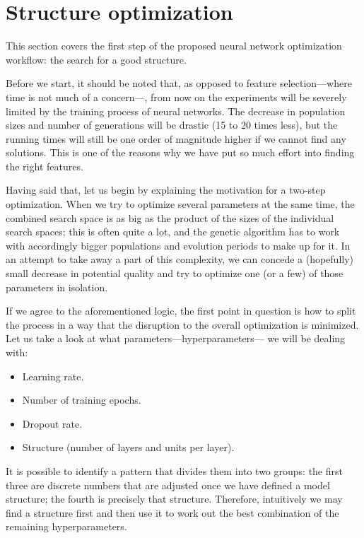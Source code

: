 \newpage

\section{Structure optimization}\label{sec:res_so}

	This section covers the first step of the proposed neural network optimization workflow: the search for a good structure.

	Before we start, it should be noted that, as opposed to feature selection---where time is not much of a concern---, from now on the experiments will be severely limited by the training process of neural networks. The decrease in population sizes and number of generations will be drastic (15 to 20 times less), but the running times will still be one order of magnitude higher if we cannot find any solutions. This is one of the reasons why we have put so much effort into finding the right features.

	Having said that, let us begin by explaining the motivation for a two-step optimization. When we try to optimize several parameters at the same time, the combined search space is as big as the product of the sizes of the individual search spaces; this is often quite a lot, and the genetic algorithm has to work with accordingly bigger populations and evolution periods to make up for it. In an attempt to take away a part of this complexity, we can concede a (hopefully) small decrease in potential quality and try to optimize one (or a few) of those parameters in isolation.

	If we agree to the aforementioned logic, the first point in question is how to split the process in a way that the disruption to the overall optimization is minimized. Let us take a look at what parameters---hyperparameters--- we will be dealing with:

	\begin{itemize}

		\item
		Learning rate.

		\item
		Number of training epochs.

		\item
		Dropout rate.

		\item
		Structure (number of layers and units per layer).

	\end{itemize}

	It is possible to identify a pattern that divides them into two groups: the first three are discrete numbers that are adjusted once we have defined a model structure; the fourth is precisely that structure. Therefore, intuitively we may find a structure first and then use it to work out the best combination of the remaining hyperparameters.

